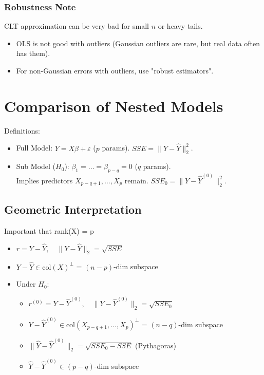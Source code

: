\subsubsection*{Robustness Note}
CLT approximation can be very bad for small $n$ or heavy tails.
\begin{itemize}
    \item OLS is not good with outliers (Gaussian outliers are rare, but real data often has them).
    \item For non-Gaussian errors with outliers, use "robust estimators".
\end{itemize}


\section{Comparison of Nested Models}
Definitions:
\begin{itemize}
    \item Full Model: $Y = X\beta + \varepsilon$ ($p$ params). $SSE = \|Y - \hat{Y}\|_2^2$.
    \item Sub Model ($H_0$): $\beta_1 = \dots = \beta_{p-q} = 0$ ($q$ params). \\
    Implies predictors $X_{p-q+1}, \dots, X_p$ remain. $SSE_0 = \|Y - \hat{Y}^{(0)}\|_2^2$.
\end{itemize}

\subsection*{Geometric Interpretation}
Important that rank(X) = p
\begin{itemize}
    \item $r = Y - \hat{Y}, \quad \|Y - \hat{Y}\|_2 = \sqrt{SSE}$
    \item $Y - \hat{Y} \in \text{col}(X)^\perp$ = $(n-p)$-dim subspace
    \item Under  $H_0$:
    \begin{itemize}
        \item $r^{(0)} = Y - \hat{Y}^{(0)}, \quad \|Y - \hat{Y}^{(0)}\|_2 = \sqrt{SSE_0}$
        \item $Y - \hat{Y}^{(0)} \in \text{col}(X_{p-q+1}, \dots, X_p)^\perp$ = $(n-q)$-dim subspace
        \item $\|\hat{Y} - \hat{Y}^{(0)}\|_2 = \sqrt{SSE_0 - SSE}$ (Pythagoras)
        \item $\hat{Y} - \hat{Y}^{(0)} \in (p-q)$-dim subspace
    \end{itemize}
\end{itemize}

